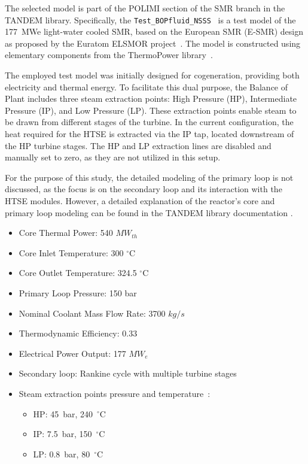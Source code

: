 The selected model is part of the POLIMI section of the SMR branch in the TANDEM library. Specifically, the \texttt{Test\_BOPfluid\_NSSS}~\cite{TANDEM} is a test model of the 177~MWe light-water cooled SMR, based on the European SMR (E-SMR) design as proposed by the Euratom ELSMOR project~\cite{tandem_documentation}. The model is constructed using elementary components from the ThermoPower library~\cite{TANDEM}.

The employed test model was initially designed for cogeneration, providing both electricity and thermal energy. To facilitate this dual purpose, the Balance of Plant includes three steam extraction points: High Pressure (HP), Intermediate Pressure (IP), and Low Pressure (LP). These extraction points enable steam to be drawn from different stages of the turbine. In the current configuration, the heat required for the HTSE is extracted via the IP tap, located downstream of the HP turbine stages. The HP and LP extraction lines are disabled and manually set to zero, as they are not utilized in this setup.

For the purpose of this study, the detailed modeling of the primary loop is not discussed, as the focus is on the secondary loop and its interaction with the HTSE modules. However, a detailed explanation of the reactor's core and primary loop modeling can be found in the TANDEM library documentation \cite{tandem_documentation}.

\begin{tcolorbox}[boxstyle, title=SMR specifics]
  \begin{itemize}
    \item Core Thermal Power: 540 $MW_{th}$
    \item Core Inlet Temperature: 300 $^{\circ}$C
    \item Core Outlet Temperature: 324.5 $^{\circ}$C
    \item Primary Loop Pressure: 150 bar
    \item Nominal Coolant Mass Flow Rate: 3700 $kg/s$
    \item Thermodynamic Efficiency: 0.33
    \item Electrical Power Output: 177 $MW_{e}$
    \item Secondary loop: Rankine cycle with multiple turbine stages 
    \item Steam extraction points pressure and temperature~\cite{tandem_documentation}:
    \begin{itemize}
      \item HP: 45~bar, 240~$^\circ$C
      \item IP: 7.5~bar, 150~$^\circ$C
      \item LP: 0.8~bar, 80~$^\circ$C
    \end{itemize}
  \end{itemize}
\end{tcolorbox}


